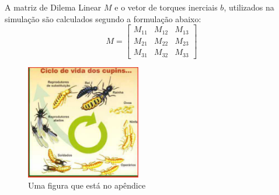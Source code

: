 \label{ape:notacao}

A matriz de Dilema Linear $M$ e o vetor de torques inerciais $b$,
utilizados na simulação são calculados segundo a formulação 
abaixo:
\begin{equation}
M=\left[ \begin{array}{ccc}
M_{11} & M_{12} & M_{13} \\
M_{21} & M_{22} & M_{23} \\
M_{31} & M_{32} & M_{33}
\end{array} \right]
\end{equation}

\begin{figure}[h]
\centering
\includegraphics[height=5cm, width=5cm]{ApeA/pragas_ciclo_cupim}
\caption{Uma figura que está no apêndice}\label{FD}
\end{figure}
